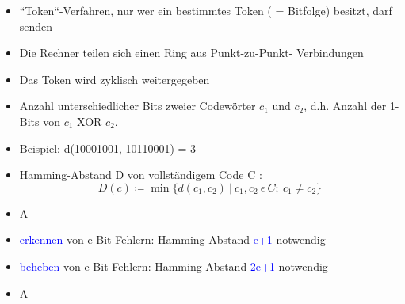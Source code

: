 \begin{itemize}
    \item “Token“-Verfahren, nur wer ein bestimmtes Token ( = Bitfolge) besitzt, darf senden
    \item Die Rechner teilen sich einen Ring aus Punkt-zu-Punkt- Verbindungen
    \item Das Token wird zyklisch weitergegeben
\end{itemize}

\begin{itemize}
    \item Anzahl unterschiedlicher Bits zweier Codewörter $c_1$ und $c_2$, d.h. Anzahl der 1-Bits von $c_1$ XOR $c_2$.
    \item Beispiel: d(10001001, 10110001) = 3
    \item Hamming-Abstand D von vollständigem Code C : \[ D(c)\coloneqq \min\{d(c_1 ,c_2)\ |\ c_1 ,c_2\ \epsilon \ C; \ c_1 \neq c_2\}\]
\end{itemize}

\begin{itemize}
    \item \todo A
\end{itemize}

\begin{itemize}
    \item \textcolor{blue}{erkennen} von e-Bit-Fehlern: Hamming-Abstand \textcolor{blue}{e+1} notwendig
    \item \textcolor{blue}{beheben} von e-Bit-Fehlern: Hamming-Abstand \textcolor{blue}{2e+1} notwendig
\end{itemize}

\begin{itemize}
    \item \todo A
\end{itemize}

